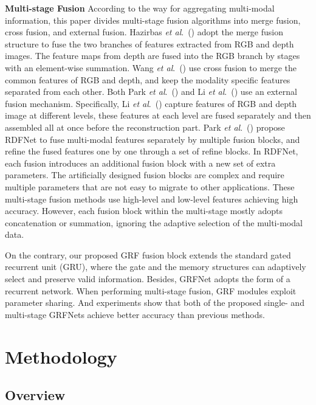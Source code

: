 \documentclass[10pt,twocolumn,letterpaper]{article}
\def\etal{\emph{et al}.}
\begin{document}
\noindent
\textbf{Multi-stage Fusion} 
According to the way for aggregating multi-modal information, this paper divides multi-stage fusion algorithms into merge fusion, cross fusion, and external fusion.
Hazirbas \etal~(\cite{hazirbas2016fusenet}) adopt the merge fusion structure to fuse the two branches of features extracted from RGB and depth images.
The feature maps from depth are fused into the RGB branch by stages with an element-wise summation.
Wang \etal~(\cite{wang2016learning}) use cross fusion to merge the common features of RGB and depth, and keep the modality specific features separated from each other.
Both Park \etal~(\cite{park2017rdfnet}) and Li \etal~(\cite{li2019rgbd}) use an external fusion mechanism. Specifically, Li \etal~(\cite{li2019rgbd}) capture features of RGB and depth image at different levels, these features at each level are fused separately and then assembled all at once before the reconstruction part. Park \etal~(\cite{park2017rdfnet}) propose RDFNet to fuse multi-modal features separately by multiple fusion blocks,
and refine the fused features one by one through a set of refine blocks. In RDFNet, each fusion introduces an additional fusion block with a new set of extra parameters.
The artificially designed fusion blocks are complex and require multiple parameters that are not easy to migrate to other applications.
These multi-stage fusion methods use high-level and low-level features achieving high accuracy. However, each fusion block within the multi-stage mostly adopts concatenation or summation, ignoring the adaptive selection of the multi-modal data.


On the contrary, our proposed GRF fusion block extends the standard gated recurrent unit (GRU), where the gate and the memory structures can adaptively select and preserve valid information. Besides, GRFNet adopts the form of a recurrent network. When performing multi-stage fusion, GRF modules exploit parameter sharing.
And experiments show that both of the proposed single- and multi-stage GRFNets achieve better accuracy than previous methods.






\section{Methodology}
\vspace{-0.1cm}
\subsection{Overview}
\vspace{-0.1cm}
\end{document}
